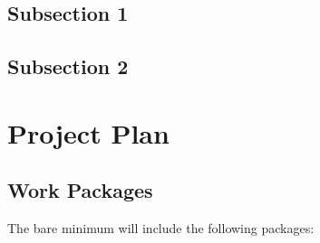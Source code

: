 \documentclass[rnd]{mas_proposal}
\begin{document}
\subsection{Subsection 1}
\subsection{Subsection 2}



\section{Project Plan}

\subsection{Work Packages}
The bare minimum will include the following packages:
\end{document}

